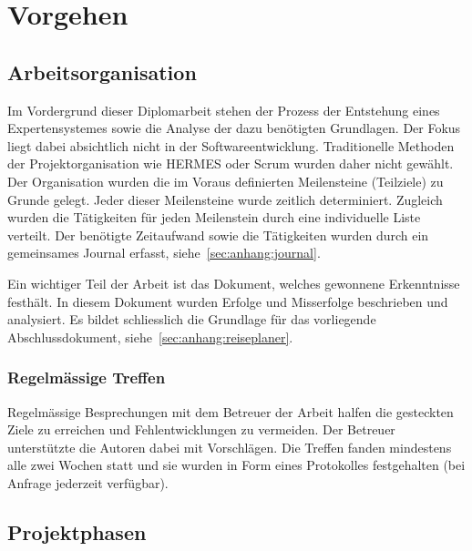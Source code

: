 \chapter{Vorgehen}
\label{chap:vorgehen}

\section{Arbeitsorganisation}
\label{sec:vorgehen_orga}
Im Vordergrund dieser Diplomarbeit stehen der Prozess der Entstehung eines Expertensystemes sowie die Analyse der dazu benötigten Grundlagen. Der Fokus liegt dabei absichtlich nicht in der Softwareentwicklung. Traditionelle Methoden der Projektorganisation wie HERMES oder Scrum wurden daher nicht gewählt.\\
Der Organisation wurden die im Voraus definierten Meilensteine (Teilziele) zu Grunde gelegt. Jeder dieser Meilensteine wurde zeitlich determiniert. Zugleich wurden die Tätigkeiten für jeden Meilenstein durch eine individuelle Liste verteilt. Der benötigte Zeitaufwand sowie die Tätigkeiten wurden durch ein gemeinsames Journal erfasst, siehe~\ref{sec:anhang:journal}.

Ein wichtiger Teil der Arbeit ist das Dokument, welches gewonnene Erkenntnisse festhält. In diesem Dokument wurden Erfolge und Misserfolge beschrieben und analysiert. Es bildet schliesslich die Grundlage für das vorliegende Abschlussdokument, siehe~\ref{sec:anhang:reiseplaner}.

\subsection{Regelmässige Treffen}
\label{sec:vorgehen_orga_treffen}
Regelmässige Besprechungen mit dem Betreuer der Arbeit halfen die gesteckten Ziele zu erreichen und Fehlentwicklungen zu vermeiden. Der Betreuer unterstützte die Autoren dabei mit Vorschlägen. Die Treffen fanden mindestens alle zwei Wochen statt und sie wurden in Form eines Protokolles festgehalten (bei Anfrage jederzeit verfügbar).

\section{Projektphasen}
\label{sec:projektphasen}

